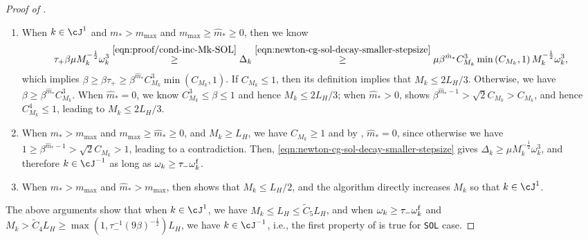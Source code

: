 \begin{proof}[Proof of ]
\begin{enumerate}
        \item When $k \in \cJ^1$ and $m_* > m_{\mathrm{max}}$ and $m_{\mathrm{max}} \geq \hat m_* \geq 0$, then we know 
        \begin{align*}
        \tau_+ \beta \mu M_k^{-\frac{1}{2}} \omega_k^3 
         \overset{\eqref{eqn:proof/cond-inc-Mk-SOL}}{\geq}
        \Delta_k
        \overset{\eqref{eqn:newton-cg-sol-decay-smaller-stepsize}}{\geq} 
        \mu \beta^{\hat m_*} C_{M_k}^3 \min\left( C_{M_k}, 1 \right) M_k^{-\frac{1}{2}} \omega_k^3
        ,
        \end{align*}
        which implies $\beta \geq \beta \tau_+ \geq  \beta^{\hat m_*} C_{M_k}^3 \min\left( C_{M_k}, 1 \right)$.
        If $C_{M_k} \leq 1$, then its definition implies that $M_k \leq 2L_H / 3$.
        Otherwise, we have 
    $\beta \geq \beta^{\hat m_*} C_{M_k}^3$.
    When $\hat m_* = 0$, we know $C_{M_k}^3 \leq \beta \leq 1$ and hence $M_k \leq 2L_H / 3$;
    when $\hat m_* > 0$,  shows $\beta^{\hat m_* - 1} > \sqrt 2 C_{M_k} > C_{M_k}$, 
    and hence $C_{M_k}^4 \leq 1$, leading to $M_k \leq 2L_H / 3$.
        \item When $m_* > m_{\mathrm{max}}$ and $m_{\mathrm{max}} \geq \hat m_* \geq 0$, and  $M_k \geq L_H$, we have $C_{M_k} \geq 1$ 
        and by , $\hat m_* = 0$, 
        since otherwise we have $1 \geq \beta^{\hat m_* - 1} > \sqrt{2} C_{M_k} > 1$, leading to a contradiction.
    Then, \eqref{eqn:newton-cg-sol-decay-smaller-stepsize} gives  
    $\Delta_k \geq \mu M_k^{-\frac{1}{2}} \omega_k^3$, 
    and therefore $k \in \cJ^{-1}$ as long as $\omega_k \geq \tau_- \omega_k^{\mathrm{f}}$.
    \item When $m_* > m_{\mathrm{max}}$ and $\hat m_* > m_{\mathrm{max}}$, then  shows that $M_k \leq L_H / 2$,
    and the algorithm directly increases $M_k$ so that $k \in \cJ^1$.
    \end{enumerate}
    The above arguments show that when $k \in \cJ^1$, we have $M_k \leq L_H \leq \tilde C_5 L_H$,
    and when $\omega_k \geq \tau_- \omega_k^{\mathrm{f}}$ and $M_k > \tilde C_4 L_H  \geq  \max(1, \tau_-^{-1}(9\beta)^{-\frac{1}{2}}) L_H$, we have $k \in \cJ^{-1}$, i.e., the first property of  is true for \texttt{SOL} case.


\end{proof}
